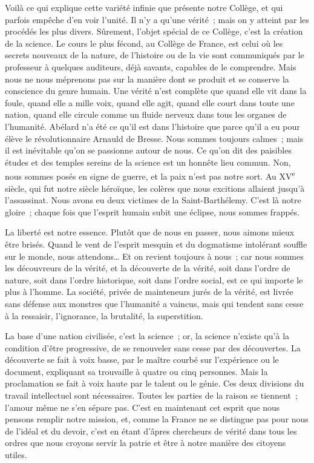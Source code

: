 \documentclass[french,twoside]{book} %
\newcommand\orgName[1]{#1}
\newcommand\persName[1]{#1}
\begin{document}
Voilà ce qui explique cette variété infinie que présente notre {\orgName Collège}, et qui parfois empêche d’en voir l’unité. Il n’y a qu’une vérité ; mais on y atteint par les procédés les plus divers. Sûrement, l’objet spécial de ce {\orgName Collège}, c’est la création de la science. Le cours le plus fécond, au {\orgName Collège de France}, est celui où les secrets nouveaux de la nature, de l’histoire ou de la vie sont communiqués par le professeur à quelques auditeurs, déjà savants, capables de le comprendre. Mais nous ne nous méprenons pas sur la manière dont se produit et se conserve la conscience du genre humain. Une vérité n’est complète que quand elle vit dans la foule, quand elle a mille voix, quand elle agit, quand elle court dans toute une nation, quand elle circule comme un fluide nerveux dans tous les organes de l’humanité. {\persName Abélard} n’a été ce qu’il est dans l’histoire que parce qu’il a eu pour élève le révolutionnaire {\persName Arnauld de Bresse}. Nous sommes toujours calmes ; mais il est inévitable qu’on se passionne autour de nous. Ce qu’on dit des paisibles études et des temples sereins de la science est un honnête lieu commun. Non, nous sommes posés en signe de guerre, et la paix n’est pas notre sort. Au XV\textsuperscript{e} siècle, qui fut notre siècle héroïque, les colères que nous excitions allaient jusqu’à l’assassinat. Nous avons eu deux victimes de la Saint-Barthélemy. C’est là notre gloire ; chaque fois que l’esprit humain subit une éclipse, nous sommes frappés.\par
La liberté est notre essence. Plutôt que de nous en passer, nous aimons mieux être brisés. Quand le vent de l’esprit mesquin et du dogmatisme intolérant souffle sur le monde, nous attendons… Et on revient toujours à nous ; car nous sommes les découvreurs de la vérité, et la découverte de la vérité, soit dans l’ordre de nature, soit dans l’ordre historique, soit dans l’ordre social, est ce qui importe le plus à l’homme. La société, privée de mainteneurs jurés de la vérité, est livrée sans défense aux monstres que l’humanité a vaincus, mais qui tendent sans cesse à la ressaisir, l’ignorance, la brutalité, la superstition.\par
La base d’une nation civilisée, c’est la science ; or, la science n’existe qu’à la condition d’être progressive, de se renouveler sans cesse par des découvertes. La découverte se fait à voix basse, par le maître courbé sur l’expérience ou le document, expliquant sa trouvaille à quatre ou cinq personnes. Mais la proclamation se fait à voix haute par le talent ou le génie. Ces deux divisions du travail intellectuel sont nécessaires. Toutes les parties de la raison se tiennent ; l’amour même ne s’en sépare pas. C’est en maintenant cet esprit que nous pensons remplir notre mission, et, comme la {\orgName France} ne se distingue pas pour nous de l’idéal et du devoir, c’est en étant d’âpres chercheurs de vérité dans tous les ordres que nous croyons servir la patrie et être à notre manière des citoyens utiles.\par
\end{document}
